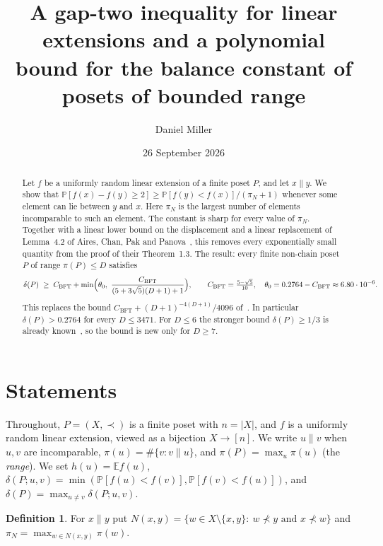 \documentclass[10pt]{amsart}
\title[A gap-two inequality and bounded range]{A gap-two inequality for linear extensions and a polynomial\\ bound for the balance constant of posets of bounded range}
\author{Daniel Miller}
\date{26 September 2026}
\theoremstyle{definition}
\newtheorem{definition}[theorem]{Definition}
\theoremstyle{remark}
\newcommand{\PP}{\mathbb{P}}
\newcommand{\EE}{\mathbb{E}}
\newcommand{\inc}{\parallel}
\newcommand{\CB}{C_{\mathrm{BFT}}}
\begin{document}
\begin{abstract}
Let $f$ be a uniformly random linear extension of a finite poset $P$, and let $x\inc y$.
We show that $\PP[f(x)-f(y)\ge 2]\ge \PP[f(y)<f(x)]/(\pi_N+1)$ whenever some element can lie between $y$ and $x$.
Here $\pi_N$ is the largest number of elements incomparable to such an element.
The constant is sharp for every value of $\pi_N$.
Together with a linear lower bound on the displacement and a linear replacement of Lemma~4.2 of Aires, Chan, Pak and Panova~\cite{KSBFT}, this removes every exponentially small quantity from the proof of their Theorem~1.3.
The result: every finite non-chain poset $P$ of range $\pi(P)\le D$ satisfies
\[
\delta(P)\;\ge\;\CB+\min\Bigl(\theta_0,\ \frac{\CB}{(5+3\sqrt5)(D+1)+1}\Bigr),
\qquad \CB=\tfrac{5-\sqrt5}{10},\quad \theta_0=0.2764-\CB\approx 6.80\cdot10^{-6}.
\]
This replaces the bound $\CB+(D+1)^{-4(D+1)}/4096$ of~\cite{KSBFT}.
In particular $\delta(P)>0.2764$ for every $D\le 3471$.
For $D\le 6$ the stronger bound $\delta(P)\ge1/3$ is already known~\cite{BW92,Pec08}, so the bound is new only for $D\ge7$.
\end{abstract}

\maketitle

\section{Statements}

Throughout, $P=(X,\prec)$ is a finite poset with $n=|X|$, and $f$ is a uniformly random linear extension, viewed as a bijection $X\to[n]$.
We write $u\inc v$ when $u,v$ are incomparable, $\pi(u)=\#\{v: v\inc u\}$, and $\pi(P)=\max_u\pi(u)$ (the \emph{range}).
We set $h(u)=\EE f(u)$, $\delta(P;u,v)=\min(\PP[f(u)<f(v)],\PP[f(v)<f(u)])$, and $\delta(P)=\max_{u\ne v}\delta(P;u,v)$.

\begin{definition}
For $x\inc y$ put $N(x,y)=\{w\in X\setminus\{x,y\}:\ w\not\prec y\text{ and }x\not\prec w\}$ and $\pi_N=\max_{w\in N(x,y)}\pi(w)$.
\end{definition}
\end{document}
